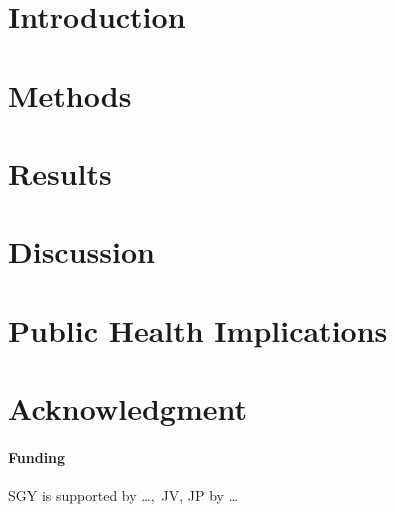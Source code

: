 \documentclass{bioinfo}
\begin{document}
\section{Introduction}
\section{Methods}
\begin{methods}
\end{methods}
\section{Results}
\section{Discussion}
\section{Public Health Implications}

\section*{Acknowledgment}
\paragraph{Funding\textcolon} SGY is supported by \ldots,\ JV, JP by \ldots

%

%

\end{document}
